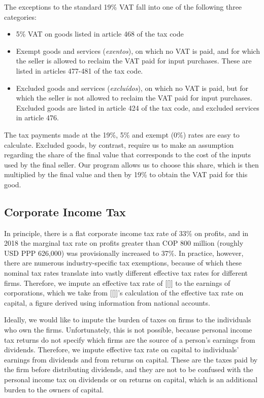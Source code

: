 \documentclass[12pt]{article}
\begin{document}
\begin{appendices}
The exceptions to the standard 19\% VAT fall into one of the following three categories:
\begin{itemize}
\item 5\% VAT on goods listed in article 468 of the tax code
\item Exempt goods and services (\textit{exentos}), on which no VAT is paid, and for which the seller is allowed to reclaim the VAT paid for input purchases.
  These are listed in articles 477-481 of the tax code.
\item Excluded goods and services (\textit{exclu\'{i}dos}), on which no VAT is paid, but for which the seller is not allowed to reclaim the VAT paid for input purchases.
  Excluded goods are listed in article 424 of the tax code, and excluded services in article 476.
\end{itemize}

The tax payments made at the 19\%, 5\% and exempt (0\%) rates are easy to calculate.
Excluded goods, by contrast, require us to make an assumption regarding the share of the final value that corresponds to the cost of the inputs used by the final seller.
Our program allows us to choose this share, which is then multiplied by the final value and then by 19\% to obtain the VAT paid for this good.

\subsection{Corporate Income Tax}

In principle, there is a flat corporate income tax rate of 33\% on profits, and in 2018 the marginal tax rate on profits greater than COP 800 million (roughly USD PPP 626,000) was provisionally increased to 37\%.
In practice, however, there are numerous industry-specific tax exemptions, because of which these nominal tax rates translate into vastly different effective tax rates for different firms.
Therefore, we impute an effective tax rate of [[]] to the earnings of corporations, which we take from [[]]'s calculation of the effective tax rate on capital, a figure derived using information from national accounts.

Ideally, we would like to impute the burden of taxes on firms to the individuals who own the firms.
Unfortunately, this is not possible, because personal income tax returns do not specify which firms are the source of a person's earnings from dividends.
Therefore, we impute effective tax rate on capital to individuals' earnings from dividends and from returns on capital.
These are the taxes paid by the firm before distributing dividends, and they are not to be confused with the personal income tax on dividends or on returns on capital, which is an additional burden to the owners of capital.


\end{appendices}
\end{document}
